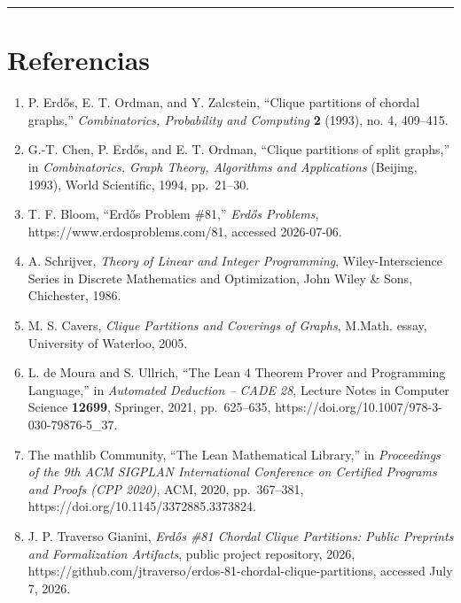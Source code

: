 \documentclass[
  11pt,
]{article}
\begin{document}
\begin{center}\rule{0.5\linewidth}{0.5pt}\end{center}

\section{Referencias}\label{referencias}

\begin{enumerate}
\def\labelenumi{\arabic{enumi}.}
\item
  P. Erdős, E. T. Ordman, and Y. Zalcstein, ``Clique partitions of
  chordal graphs,'' \emph{Combinatorics, Probability and Computing}
  \textbf{2} (1993), no. 4, 409--415.
\item
  G.-T. Chen, P. Erdős, and E. T. Ordman, ``Clique partitions of split
  graphs,'' in \emph{Combinatorics, Graph Theory, Algorithms and
  Applications} (Beijing, 1993), World Scientific, 1994, pp.~21--30.
\item
  T. F. Bloom, ``Erdős Problem \#81,'' \emph{Erdős Problems},
  https://www.erdosproblems.com/81, accessed 2026-07-06.
\item
  A. Schrijver, \emph{Theory of Linear and Integer Programming},
  Wiley-Interscience Series in Discrete Mathematics and Optimization,
  John Wiley \& Sons, Chichester, 1986.
\item
  M. S. Cavers, \emph{Clique Partitions and Coverings of Graphs},
  M.Math. essay, University of Waterloo, 2005.
\item
  L. de Moura and S. Ullrich, ``The Lean 4 Theorem Prover and
  Programming Language,'' in \emph{Automated Deduction -- CADE 28},
  Lecture Notes in Computer Science \textbf{12699}, Springer, 2021,
  pp.~625--635, https://doi.org/10.1007/978-3-030-79876-5\_37.
\item
  The mathlib Community, ``The Lean Mathematical Library,'' in
  \emph{Proceedings of the 9th ACM SIGPLAN International Conference on
  Certified Programs and Proofs (CPP 2020)}, ACM, 2020, pp.~367--381,
  https://doi.org/10.1145/3372885.3373824.
\item
  J. P. Traverso Gianini, \emph{Erdős \#81 Chordal Clique Partitions:
  Public Preprints and Formalization Artifacts}, public project
  repository, 2026,
  https://github.com/jtraverso/erdos-81-chordal-clique-partitions,
  accessed July 7, 2026.
\end{enumerate}
\end{document}
